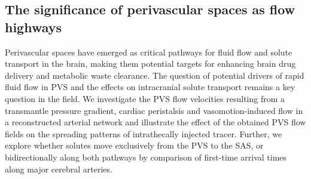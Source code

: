 \documentclass[fleqn,10pt]{wlscirep}
\newcommand{\mer}[1]{\textcolor{magenta}{#1}}
\newcommand{\mar}[1]{\textcolor{violet}{#1}}
\begin{document}



\subsection*{The significance of perivascular spaces as flow highways}
\label{sec:pvs_flow_results}

Perivascular spaces have emerged as critical pathways for fluid flow and solute transport in the brain, making them potential targets for enhancing brain drug delivery and metabolic waste clearance. The question of potential drivers of rapid fluid flow in PVS and the effects on intracranial solute transport remains a key question in the field. We investigate the PVS flow velocities resulting from a transmantle pressure gradient, cardiac peristalsis and vasomotion-induced flow in a reconstructed arterial network and illustrate the effect of the obtained PVS flow fields on the spreading patterns of intrathecally injected tracer. Further, we explore whether solutes move exclusively from the PVS to the SAS, or bidirectionally along both pathways by comparison of first-time arrival times along major cerebral arteries.
\end{document}
